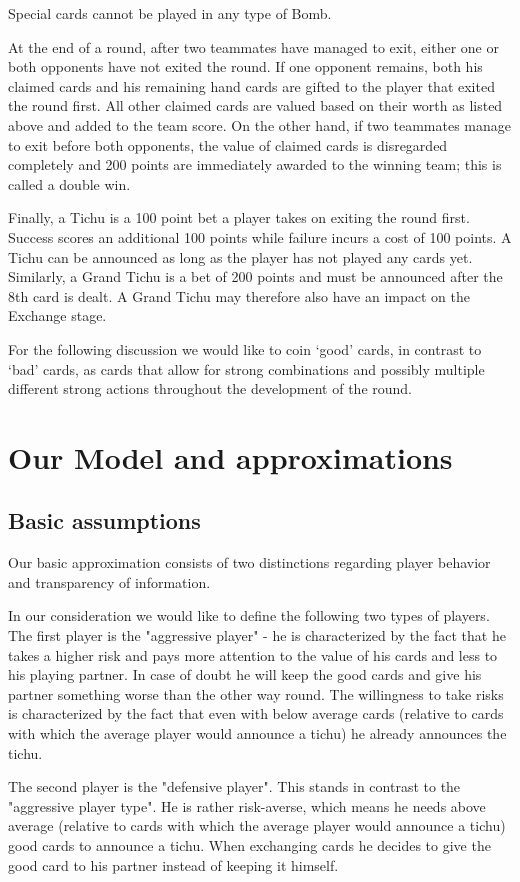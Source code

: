 Special cards cannot be played in any type of Bomb.

At the end of a round, after two teammates have managed to exit, either one or both opponents have not exited the round. If one opponent remains, both his claimed cards and his remaining hand cards are gifted to the player that exited the round first. All other claimed cards are valued based on their worth as listed above and added to the team score. On the other hand, if two teammates manage to exit before both opponents, the value of claimed cards is disregarded completely and 200 points are immediately awarded to the winning team; this is called a double win.

Finally, a Tichu is a 100 point bet a player takes on exiting the round first. Success scores an additional 100 points while failure incurs a cost of 100 points. A Tichu can be announced as long as the player has not played any cards yet. Similarly, a Grand Tichu is a bet of 200 points and must be announced after the 8th card is dealt. A Grand Tichu may therefore also have an impact on the Exchange stage.

For the following discussion we would like to coin ‘good’ cards, in contrast to ‘bad’ cards, as cards that allow for strong combinations and possibly multiple different strong actions throughout the development of the round.


\section{Our Model and approximations}
\subsection{Basic assumptions}
Our basic approximation consists of two distinctions regarding player behavior and transparency of information. 

In our consideration we would like to define the following two types of players.
The first player is the "aggressive player" - he is characterized by the fact that he takes a higher risk and pays more attention to the value of his cards and less to his playing partner. In case of doubt he will keep the good cards and give his partner something worse than the other way round.
The willingness to take risks is characterized by the fact that even with below average cards (relative to cards with which the average player would announce a tichu) he already announces the tichu. 

The second player is the "defensive player". This stands in contrast to the "aggressive player type". He is rather risk-averse, which means he needs above average (relative to cards with which the average player would announce a tichu) good cards to announce a tichu.
When exchanging cards he decides to give the good card to his partner instead of keeping it himself.

